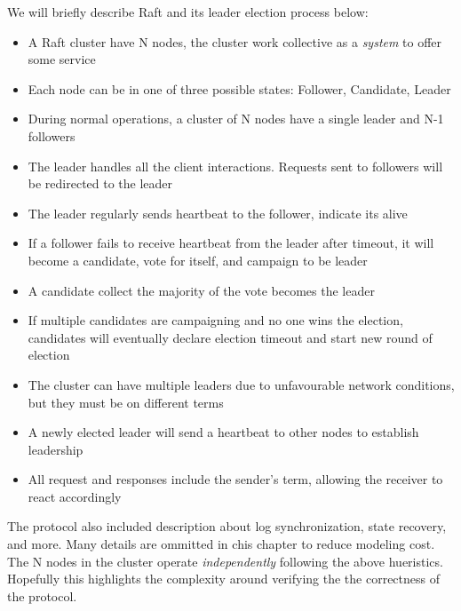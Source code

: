 \documentclass{report}
\begin{document}
We will briefly describe Raft and its leader election process below: 
\begin{itemize}
    \item A Raft cluster have N nodes, the cluster work collective as a
    \textit{system} to offer some service
    \item Each node can be in one of three possible states: Follower, Candidate, Leader
    \item During normal operations, a cluster of N nodes have a single leader
    and N-1 followers
    \item The leader handles all the client interactions. Requests sent to followers will be 
    redirected to the leader
    \item The leader regularly sends heartbeat to the follower, indicate its
    alive
    \item If a follower fails to receive heartbeat from the leader after
    timeout, it will become a candidate, vote for itself, and campaign to be
    leader
    \item A candidate collect the majority of the vote becomes the leader
    \item If multiple candidates are campaigning and no one wins the election, 
    candidates will eventually declare election timeout and start new round of
    election
    \item The cluster can have multiple leaders due to unfavourable network conditions, 
    but they must be on different terms 
    \item A newly elected leader will send a heartbeat to other nodes to establish 
    leadership 
    \item All request and responses include the sender's term, allowing the
    receiver to react accordingly
\end{itemize}

The protocol also included description about log synchronization, state
recovery, and more. Many details are ommitted in chis chapter to reduce modeling
cost. The N nodes in the cluster operate \textit{independently} following the
above hueristics. Hopefully this highlights the complexity around verifying the
the correctness of the protocol.\newline
\end{document}
